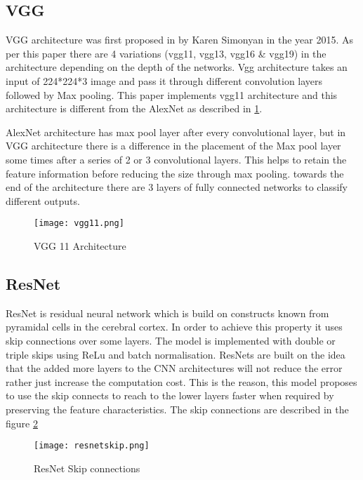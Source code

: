 \subsection{VGG}
VGG architecture was first proposed in \cite{simonyan2014very} by Karen Simonyan in the year 2015. As per this paper there are 4 variations (vgg11, vgg13, vgg16 \& vgg19) in the architecture depending on the depth of the networks. Vgg architecture takes an input of 224*224*3 image and pass it through different convolution layers followed by Max pooling. This paper implements vgg11 architecture and this architecture is different from the AlexNet as described in \ref{fig:vgg11}.

AlexNet architecture has max pool layer after every convolutional layer, but in VGG architecture there is a difference in the placement of the Max pool layer some times after a series of 2 or 3 convolutional layers. This helps to retain the feature information before reducing the size through max pooling. towards the end of the architecture there are 3 layers of fully connected networks to classify different outputs.
\begin{figure}[h!]
	\center\texttt{[image: vgg11.png]}
	\caption{VGG 11 Architecture}
	\label{fig:vgg11}
\end{figure}
  
\subsection{ResNet}
ResNet is residual neural network which is build on constructs known from pyramidal cells in the cerebral cortex. In order to achieve this property it uses skip connections over some layers. The model is implemented with double or triple skips using ReLu and batch normalisation. ResNets are built on the idea that the added more layers to the CNN architectures will not reduce the error rather just increase the computation cost. This is the reason, this model proposes to use the skip connects to reach to the lower layers faster when required by preserving the feature characteristics. The skip connections are described in the figure \ref{fig:resnetskip}
\begin{figure}[h!]
	\center\texttt{[image: resnetskip.png]}
	\caption{ResNet Skip connections}
	\label{fig:resnetskip}
\end{figure}

